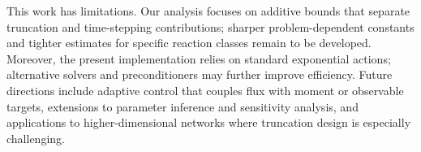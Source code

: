 \documentclass[review,onefignum,onetabnum]{siamart171218}
\begin{document}
This work has limitations. Our analysis focuses on additive bounds that separate truncation and time-stepping contributions; sharper problem-dependent constants and tighter estimates for specific reaction classes remain to be developed. Moreover, the present implementation relies on standard exponential actions; alternative solvers and preconditioners may further improve efficiency. Future directions include adaptive control that couples flux with moment or observable targets, extensions to parameter inference and sensitivity analysis, and applications to higher-dimensional networks where truncation design is especially challenging.




\end{document}
